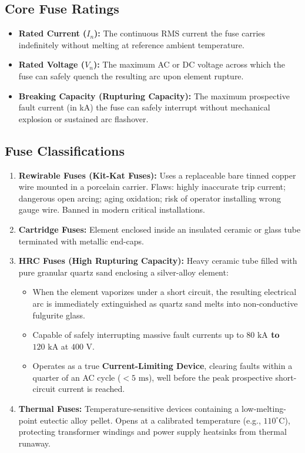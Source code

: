 \subsection{Core Fuse Ratings}
\begin{itemize}
    \item \textbf{Rated Current ($I_n$):} The continuous RMS current the fuse carries indefinitely without melting at reference ambient temperature.
    \item \textbf{Rated Voltage ($V_n$):} The maximum AC or DC voltage across which the fuse can safely quench the resulting arc upon element rupture.
    \item \textbf{Breaking Capacity (Rupturing Capacity):} The maximum prospective fault current (in kA) the fuse can safely interrupt without mechanical explosion or sustained arc flashover.
\end{itemize}

\subsection{Fuse Classifications}
\begin{enumerate}[label=\bfseries\arabic*.]
    \item \textbf{Rewirable Fuses (Kit-Kat Fuses):} Uses a replaceable bare tinned copper wire mounted in a porcelain carrier. Flaws: highly inaccurate trip current; dangerous open arcing; aging oxidation; risk of operator installing wrong gauge wire. Banned in modern critical installations.
    \item \textbf{Cartridge Fuses:} Element enclosed inside an insulated ceramic or glass tube terminated with metallic end-caps.
    \item \textbf{HRC Fuses (High Rupturing Capacity):} Heavy ceramic tube filled with pure granular quartz sand enclosing a silver-alloy element:
    \begin{itemize}
        \item When the element vaporizes under a short circuit, the resulting electrical arc is immediately extinguished as quartz sand melts into non-conductive fulgurite glass.
        \item Capable of safely interrupting massive fault currents up to \textbf{$80\text{ kA}$ to $120\text{ kA}$} at $400\text{ V}$.
        \item Operates as a true \textbf{Current-Limiting Device}, clearing faults within a quarter of an AC cycle ($<5\text{ ms}$), well before the peak prospective short-circuit current is reached.
    \end{itemize}
    \item \textbf{Thermal Fuses:} Temperature-sensitive devices containing a low-melting-point eutectic alloy pellet. Opens at a calibrated temperature (e.g., $110^{\circ}\text{C}$), protecting transformer windings and power supply heatsinks from thermal runaway.
\end{enumerate}


